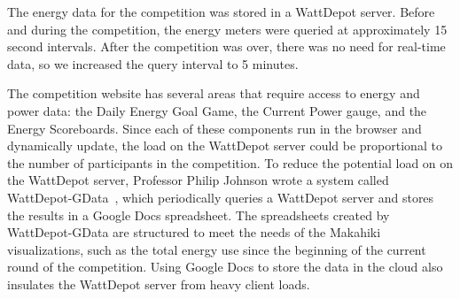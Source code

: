 The energy data for the competition was stored in a WattDepot server. Before and during the competition, the energy meters were queried at approximately 15 second intervals. After the competition was over, there was no need for real-time data, so we increased the query interval to 5 minutes.

The competition website has several areas that require access to energy and power data: the Daily Energy Goal Game, the Current Power gauge, and the Energy Scoreboards. Since each of these components run in the browser and dynamically update, the load on the WattDepot server could be proportional to the number of participants in the competition. To reduce the potential load on on the WattDepot server, Professor Philip Johnson wrote a system called WattDepot-GData~\cite{wattdepot-gdata}, which periodically queries a WattDepot server and stores the results in a Google Docs spreadsheet. The spreadsheets created by WattDepot-GData are structured to meet the needs of the Makahiki visualizations, such as the total energy use since the beginning of the current round of the competition. Using Google Docs to store the data in the cloud also insulates the WattDepot server from heavy client loads.
